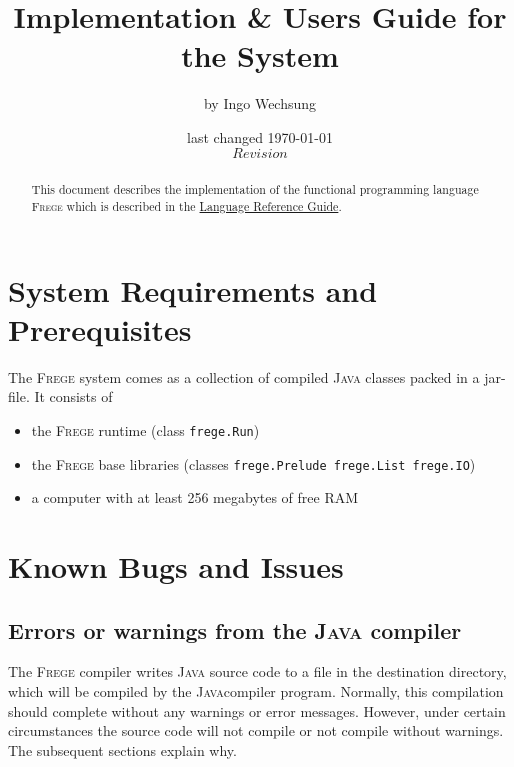 \documentclass[a4paper]{article}
\date{last changed \today{} \\ $Revision$}
\author{\small{by Ingo Wechsung}}
\title{Implementation \& Users Guide for the \frege{} System}
\newcommand{\frege}[0]{\textsc{Frege}}
\newcommand{\java}{\textsc{Java}}
\begin{document}
\maketitle

\begin{abstract}

This document describes the implementation of
the functional programming language \frege{}
which is described in
the \href{file:./Language.pdf}{Language Reference Guide}.


\end{abstract}

\tableofcontents

\listoffigures

\section{System Requirements and Prerequisites}

The \frege{} system comes as a collection of compiled \java{} classes packed in a jar-file.
It consists of 
\begin{itemize}
\item the \frege{} runtime (class {\tt frege.Run})
\item the \frege{} base libraries (classes {\tt frege.Prelude frege.List frege.IO})
\end{itemize}

\begin{itemize}
\item a computer with at least 256 megabytes of free RAM
\end{itemize}


\section{Known Bugs and Issues}

\subsection{Errors or warnings from the \java{} compiler}

The \frege{} compiler writes \java{} source code to a file in the destination directory,
which will be compiled by the \java compiler program. Normally, this compilation
should complete without any warnings or error messages. However, under certain circumstances
the source code will not compile or not compile without warnings. The subsequent
sections explain why.
\end{document}
